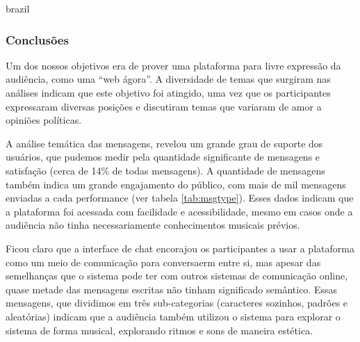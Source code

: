 \begin{otherlanguage*}{brazil}
\subsubsection{Conclusões}

Um dos nossos objetivos era de prover uma plataforma para livre expressão da audiência, como uma ``web ágora''. A diversidade de temas que surgiram nas análises indicam que este objetivo foi atingido, uma vez que os participantes expressaram diversas posições e discutiram temas que variaram de amor a opiniões políticas.

A análise temática das mensagens, revelou um grande grau de suporte dos usuários, que pudemos medir pela quantidade significante de mensagens e satisfação (cerca de 14\% de todas mensagens). A quantidade de mensagens também indica um grande engajamento do público, com mais de mil mensagens enviadas a cada performance (ver tabela \ref{tab:msgtype}). Esses dados indicam que a plataforma foi acessada com facilidade e acessibilidade, mesmo em casos onde a audiência não tinha necessariamente conhecimentos musicais prévios. 



Ficou claro que a interface de chat encorajou os participantes a usar a plataforma como um meio de comunicação para conversaerm entre si, mas apesar das semelhanças que o sistema pode ter com outros sistemas de comunicação online, quase metade das mensagens escritas não tinham significado semântico. Essas mensagens, que dividimos em três sub-categorias (caracteres sozinhos, padrões e aleatórias) indicam que a audiência também utilizou o sistema para explorar o sistema de forma musical, explorando ritmos e sons de maneira estética.


\end{otherlanguage*}
